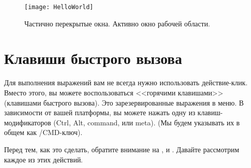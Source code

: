 \documentclass[a4paper,10pt,twoside]{book}
\begin{document}
\begin{figure}[htb]
\centerline {\texttt{[image: HelloWorld]}}
\caption{Частично перекрытые окна. Активно окно рабочей
области. }
\end{figure}

\section{Клавиши быстрого вызова}


Для выполнения выражений вам не всегда нужно использовать
действие-клик. Вместо этого, вы можете воспользоваться
<<горячими клавишами>> (клавишами быстрого вызова).
Это зарезервированные выражения в меню. В зависимости от
вашей платформы, вы можете нажать одну из клавиш-модификаторов
(Ctrl, Alt, command, или meta). (Мы будем
указывать их в общем как /CMD-ключ). 




Перед тем, как это сделать, обратите внимание на ,
 и .
Давайте рассмотрим каждое из этих действий.


\end{document}
